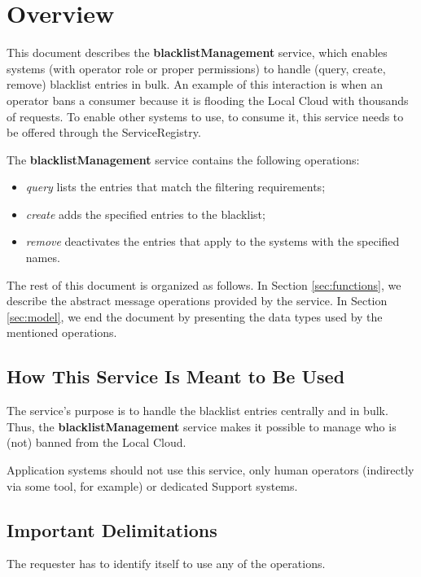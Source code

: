 \documentclass[a4paper]{arrowhead}
\begin{document}
\section{Overview}
\label{sec:overview}
This document describes the \textbf{blacklistManagement} service, which enables systems (with operator role or proper permissions) to handle (query, create, remove) blacklist entries in bulk. An example of this interaction is when an operator bans a consumer because it is flooding the Local Cloud with thousands of requests. To enable other systems to use, to consume it, this service needs to be offered through the ServiceRegistry.

The \textbf{blacklistManagement} service contains the following operations:

\begin{itemize}
    \item \textit{query} lists the entries that match the filtering requirements;
    \item \textit{create} adds the specified entries to the blacklist;
    \item \textit{remove} deactivates the entries that apply to the systems with the specified names.
\end{itemize}

The rest of this document is organized as follows.
In Section \ref{sec:functions}, we describe the abstract message operations provided by the service.
In Section \ref{sec:model}, we end the document by presenting the data types used by the mentioned operations.

\subsection{How This Service Is Meant to Be Used}
The service's purpose is to handle the blacklist entries centrally and in bulk. Thus, the \textbf{blacklistManagement} service makes it possible to manage who is (not) banned from the Local Cloud.

Application systems should not use this service, only human operators (indirectly via some tool, for example) or dedicated Support systems.

\subsection{Important Delimitations}
\label{sec:delimitations}

The requester has to identify itself to use any of the operations.
\end{document}
